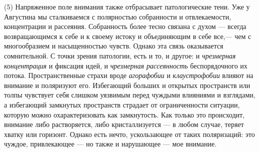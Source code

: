 \documentclass[12pt]{book}
\begin{document}
(5) Напряженное поле внимания также отбрасывает патологические тени. Уже у Августина мы сталкиваемся с полярностью собранности и отвлекаемости, концентрации и рассеяния. Собранность более тесно связана с духом --- всегда возвращающимся к себе и к своему истоку и объединяющим в себе все,--- чем с многообразием и насыщенностью чувств. Однако эта связь оказывается сомнительной. С точки зрения патологии, есть и то, и другое: и \textit{чрезмерная концентрация} и фиксация идей, и \textit{чрезмерная рассеянность} беспорядочного их потока. Пространственные страхи вроде \textit{агорафобии} и \textit{клаустрофобии} влияют на внимание и поляризуют его. Избегающий больших и открытых пространств или толпы чувствует себя слишком уязвимым перед чуждыми влияниями и взглядами, а избегающий замкнутых пространств страдает от ограниченности ситуации, которую можно охарактеризовать как замкнутость. Как только это происходит, внимание либо растворяется, либо кристаллизуется --- в любом случае, теряет хватку или горизонт. Однако есть нечто, ускользающее от таких поляризаций: это чуждое, привлекающее --- но также и нарушающее --- мое внимание.
\end{document}
